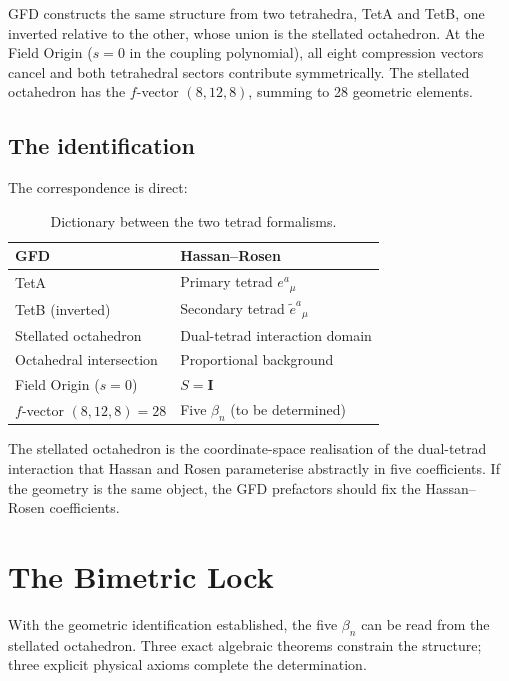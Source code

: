 \documentclass[twocolumn,showpacs,preprintnumbers,amsmath,amssymb,prd]{revtex4-2}
\begin{document}
GFD constructs the same structure from two tetrahedra, TetA and TetB, one inverted relative to the other, whose union is the stellated octahedron. At the Field Origin ($s = 0$ in the coupling polynomial), all eight compression vectors cancel and both tetrahedral sectors contribute symmetrically. The stellated octahedron has the $f$-vector $(8, 12, 8)$, summing to 28 geometric elements.

\subsection{The identification}

The correspondence is direct:

\begin{table}[h]
\centering
\begin{tabular}{ll}
\toprule
\textbf{GFD} & \textbf{Hassan--Rosen} \\
\midrule
TetA & Primary tetrad $e^a{}_\mu$ \\
TetB (inverted) & Secondary tetrad $\tilde{e}^a{}_\mu$ \\
Stellated octahedron & Dual-tetrad interaction domain \\
Octahedral intersection & Proportional background \\
Field Origin ($s=0$) & $S = \mathbf{I}$ \\
$f$-vector $(8,12,8) = 28$ & Five $\beta_n$ (to be determined) \\
\bottomrule
\end{tabular}
\caption{Dictionary between the two tetrad formalisms.}
\label{tab:dictionary}
\end{table}

The stellated octahedron is the coordinate-space realisation of the dual-tetrad interaction that Hassan and Rosen parameterise abstractly in five coefficients. If the geometry is the same object, the GFD prefactors should fix the Hassan--Rosen coefficients.


\section{The Bimetric Lock}
\label{sec:lock}

With the geometric identification established, the five $\beta_n$ can be read from the stellated octahedron. Three exact algebraic theorems constrain the structure; three explicit physical axioms complete the determination.
\end{document}
